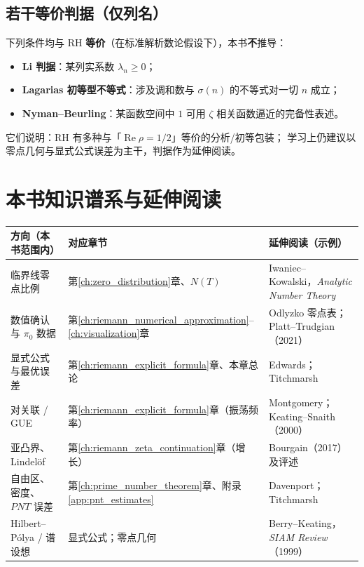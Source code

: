 \subsection{若干等价判据（仅列名）}

下列条件均与 RH \textbf{等价}（在标准解析数论假设下），本书\textbf{不}推导：
\begin{itemize}
  \item \textbf{Li 判据}：某列实系数 $\lambda_n\geq 0$；
  \item \textbf{Lagarias 初等型不等式}：涉及调和数与 $\sigma(n)$ 的不等式对一切 $n$ 成立；
  \item \textbf{Nyman--Beurling}：某函数空间中 $1$ 可用 $\zeta$ 相关函数逼近的完备性表述。
\end{itemize}
它们说明：RH 有多种与「$\operatorname{Re}\rho=1/2$」等价的分析/初等包装；
学习上仍建议以零点几何与显式公式误差为主干，判据作为延伸阅读。

\section{本书知识谱系与延伸阅读}

\begin{center}
\renewcommand{\arraystretch}{1.7}
\begin{tabular}{|>{\raggedright\arraybackslash}p{4.6cm}|>{\raggedright\arraybackslash}p{4.4cm}|>{\raggedright\arraybackslash}p{5cm}|}
\hline
\textbf{方向（本书范围内）} & \textbf{对应章节} & \textbf{延伸阅读（示例）} \\
\hline
临界线零点比例 & 第\ref{ch:zero_distribution}章、$N(T)$ & Iwaniec--Kowalski，\textit{Analytic Number Theory} \\
\hline
数值确认与 $\pi_0$ 数据 & 第\ref{ch:riemann_numerical_approximation}--\ref{ch:visualization}章 & Odlyzko 零点表；Platt--Trudgian（2021） \\
\hline
显式公式与最优误差 & 第\ref{ch:riemann_explicit_formula}章、本章总论 & Edwards；Titchmarsh \\
\hline
对关联 / GUE & 第\ref{ch:riemann_explicit_formula}章（振荡频率） & Montgomery；Keating--Snaith（2000） \\
\hline
亚凸界、Lindelöf & 第\ref{ch:riemann_zeta_continuation}章（增长） & Bourgain（2017）及评述 \\
\hline
自由区、密度、$PNT$ 误差 & 第\ref{ch:prime_number_theorem}章、附录\ref{app:pnt_estimates} & Davenport；Titchmarsh \\
\hline
Hilbert--Pólya / 谱设想 & 显式公式；零点几何 & Berry--Keating，\textit{SIAM Review}（1999） \\
\hline
\end{tabular}
\end{center}


